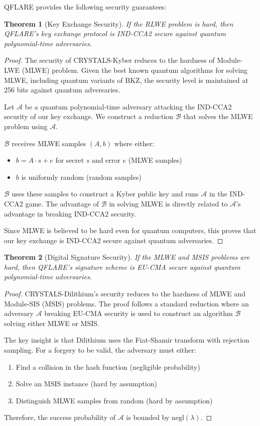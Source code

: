 \documentclass[journal,onecolumn,draftclsnofoot]{IEEEtran}
\newtheorem{theorem}{Theorem}
\newtheorem{proof}{Proof}
\begin{document}
QFLARE provides the following security guarantees:

\begin{theorem}[Key Exchange Security]
If the RLWE problem is hard, then QFLARE's key exchange protocol is IND-CCA2 secure against quantum polynomial-time adversaries.
\end{theorem}

\begin{proof}
The security of CRYSTALS-Kyber reduces to the hardness of Module-LWE (MLWE) problem. Given the best known quantum algorithms for solving MLWE, including quantum variants of BKZ, the security level is maintained at 256 bits against quantum adversaries.

Let $\mathcal{A}$ be a quantum polynomial-time adversary attacking the IND-CCA2 security of our key exchange. We construct a reduction $\mathcal{B}$ that solves the MLWE problem using $\mathcal{A}$.

$\mathcal{B}$ receives MLWE samples $(A, b)$ where either:
\begin{itemize}
\item $b = A \cdot s + e$ for secret $s$ and error $e$ (MLWE samples)
\item $b$ is uniformly random (random samples)
\end{itemize}

$\mathcal{B}$ uses these samples to construct a Kyber public key and runs $\mathcal{A}$ in the IND-CCA2 game. The advantage of $\mathcal{B}$ in solving MLWE is directly related to $\mathcal{A}$'s advantage in breaking IND-CCA2 security.

Since MLWE is believed to be hard even for quantum computers, this proves that our key exchange is IND-CCA2 secure against quantum adversaries.
\end{proof}

\begin{theorem}[Digital Signature Security]
If the MLWE and MSIS problems are hard, then QFLARE's signature scheme is EU-CMA secure against quantum polynomial-time adversaries.
\end{theorem}

\begin{proof}
CRYSTALS-Dilithium's security reduces to the hardness of MLWE and Module-SIS (MSIS) problems. The proof follows a standard reduction where an adversary $\mathcal{A}$ breaking EU-CMA security is used to construct an algorithm $\mathcal{B}$ solving either MLWE or MSIS.

The key insight is that Dilithium uses the Fiat-Shamir transform with rejection sampling. For a forgery to be valid, the adversary must either:
\begin{enumerate}
\item Find a collision in the hash function (negligible probability)
\item Solve an MSIS instance (hard by assumption)
\item Distinguish MLWE samples from random (hard by assumption)
\end{enumerate}

Therefore, the success probability of $\mathcal{A}$ is bounded by $\text{negl}(\lambda)$.
\end{proof}
\end{document}
